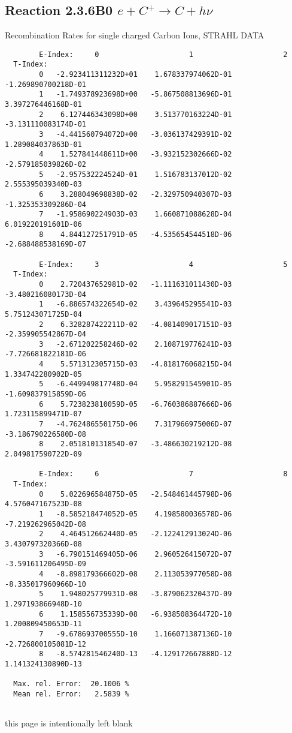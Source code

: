 \subsection{
Reaction 2.3.6B0  $e + C^{+} \rightarrow C + h\nu$
}
 Recombination Rates for single
 charged Carbon Ions, STRAHL DATA

\begin{verbatim}
        E-Index:     0                     1                     2
  T-Index:
        0   -2.923411311232D+01    1.678337974062D-01   -1.269890700218D-01
        1   -1.749378923698D+00   -5.867508813696D-01    3.397276446168D-01
        2    6.127446343098D+00    3.513770163224D-01   -3.131110083174D-01
        3   -4.441560794072D+00   -3.036137429391D-02    1.289084037863D-01
        4    1.527841448611D+00   -3.932152302666D-02   -2.579185039826D-02
        5   -2.957532224524D-01    1.516783137012D-02    2.555395039340D-03
        6    3.288049698838D-02   -2.329750940307D-03   -1.325353309286D-04
        7   -1.958690224903D-03    1.660871088628D-04    6.019220191601D-06
        8    4.844127251791D-05   -4.535654544518D-06   -2.688488538169D-07

        E-Index:     3                     4                     5
  T-Index:
        0    2.720437652981D-02   -1.111631011430D-03   -3.480216080173D-04
        1   -6.886574322654D-02    3.439645295541D-03    5.751243071725D-04
        2    6.328287422211D-02   -4.081409017151D-03   -2.359905542867D-04
        3   -2.671202258246D-02    2.108719776241D-03   -7.726681822181D-06
        4    5.571312305715D-03   -4.818176068215D-04    1.334742280902D-05
        5   -6.449949817748D-04    5.958291545901D-05   -1.609837915859D-06
        6    5.723823810059D-05   -6.760386887666D-06    1.723115899471D-07
        7   -4.762486550175D-06    7.317966975006D-07   -3.186790226580D-08
        8    2.051810131854D-07   -3.486630219212D-08    2.049817590722D-09

        E-Index:     6                     7                     8
  T-Index:
        0    5.022696584875D-05   -2.548461445798D-06    4.576047167523D-08
        1   -8.585218474052D-05    4.198580036578D-06   -7.219262965042D-08
        2    4.464512662440D-05   -2.122412913024D-06    3.430797320366D-08
        3   -6.790151469405D-06    2.960526415072D-07   -3.591611206495D-09
        4   -8.898179366602D-08    2.113053977058D-08   -8.335017960966D-10
        5    1.948025779931D-08   -3.879062320437D-09    1.297193866948D-10
        6    1.158556735339D-08   -6.938508364472D-10    1.200809450653D-11
        7   -9.678693700555D-10    1.166071387136D-10   -2.726800105081D-12
        8   -8.574281546240D-13   -4.129172667888D-12    1.141324130890D-13

  Max. rel. Error:  20.1006 %
  Mean rel. Error:   2.5839 %


\end{verbatim}
\newpage
this page is intentionally left blank
\newpage

